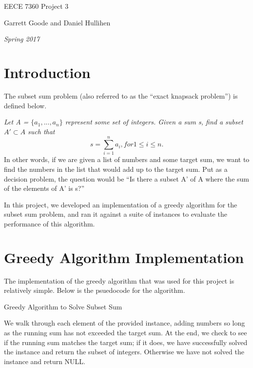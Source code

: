 \documentclass{article}
\begin{document}
\centerline{\sc \large EECE 7360 Project 3}
\vspace{.5pc}
\centerline{\sc Garrett Goode and Daniel Hullihen}
\centerline{\it Spring 2017}

\section{Introduction}
The subset sum problem (also referred to as the ``exact knapsack problem'')
is defined below.

\textit{Let A = $\{a_1, ..., a_n\}$ represent some set of integers. Given a sum s, find a subset $A' \subset A$ such that
  $$s = \sum_{i=1}^n a_i, for 1 \le i \le n.$$}
In other words, if we are given a list of numbers and some target sum, we want
to find the numbers in the list that would add up to the target sum. Put as a decision
problem, the question would be ``Is there a subset A' of A where the sum of the
elements of A' is s?''

In this project, we developed an implementation of a greedy algorithm
for the subset sum problem, and ran it against a suite of instances to evaluate
the performance of this algorithm.

\section{Greedy Algorithm Implementation}
The implementation of the greedy algorithm that was used for this project is relatively simple.
Below is the psuedocode for the algorithm.

\begin{algorithm}
  \caption{Greedy Algorithm to Solve Subset Sum}
  \label{greedy}
  \begin{algorithmic}
     
    \ENDIF
    \ENDFOR
    \ELSE
    \ENDIF
  \end{algorithmic}
\end{algorithm}

We walk through each element of the provided instance, adding numbers so long
as the running sum has not exceeded the target sum. At the end, we check to see
if the running sum matches the target sum; if it does, we have successfully solved
the instance and return the subset of integers. Otherwise we have not solved the instance
and return NULL.
\end{document}
